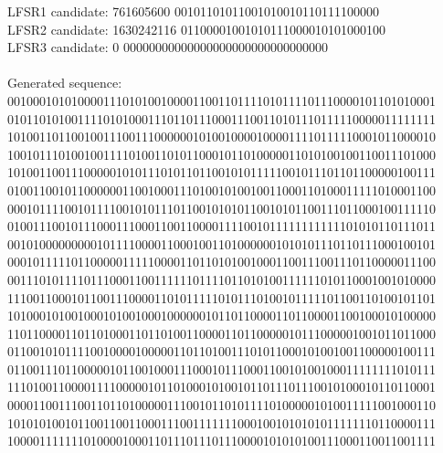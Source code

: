 \documentclass[12pt]{article}
\begin{document}
\begin{itemize}
LFSR1 candidate:  761605600 00101101011001010010110111100000 \\ 
LFSR2 candidate: 1630242116 01100001001010111000010101000100 \\
LFSR3 candidate:          0 00000000000000000000000000000000 \\ 
\\
Generated sequence: \\
0010001010100001110101001000011001101111010111101110000101101010001 \\
0101101010011110101000111011011100011100110101110111110000011111111 \\
1010011011001001110011100000010100100001000011110111110001011000010 \\
1001011101001001111010011010110001011010000011010100100110011101000 \\
1010011001110000010101110101101100101011111001011101101100000100111 \\
0100110010110000001100100011101001010010011000110100011111010001100 \\
0001011110010111100101011101100101010110010101100111011000100111110 \\
0100111001011100011100011001100001111001011111111111101010110111011 \\
0010100000000010111100001100010011010000001010101110110111000100101 \\
0001011111011000001111100001101101010010001100111001110110000011100 \\
0011101011110111000110011111101111011010100111111010110001001010000 \\
1110011000101100111000011010111110101110100101111101100110100101101 \\
1010001010010001010010001000000101101100001101100001100100010100000 \\
1101100001101101000110110100110000110110000010111000001001011011000 \\
0110010101111001000010000011011010011101011000101001001100000100111 \\
0110011101100000101100100011100010111000110010100100011111111010111 \\
1110100110000111100000101101000101001011011101110010100010110110001 \\
0000110011100110110100000111001011010111101000001010011111001000110 \\
1010101001011001100110001110011111110001001010101011111110110000111 \\
1000011111110100001000110111011101110000101010100111000110011001111 \\

\end{itemize}
\end{document}
